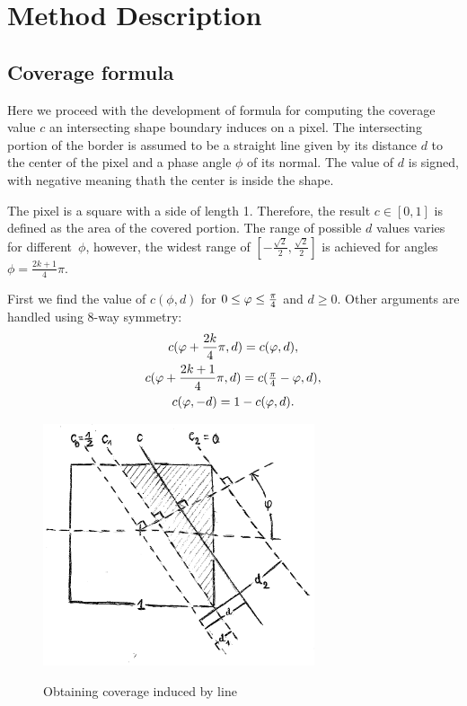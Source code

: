 \section{Method Description}

\subsection{Coverage formula}

Here we proceed with the development of formula for computing the coverage value $c$ an intersecting shape boundary induces on a pixel. The intersecting portion of the border is assumed to be a straight line given by its distance $d$ to the center of the pixel and a phase angle $\phi$ of its normal. The value of $d$ is signed, with negative meaning thath the center is inside the shape.

The pixel is a square with a side of length 1. Therefore, the result $c \in [0, 1]$ is defined as the area of the covered portion. The range of possible $d$ values varies for different~$\phi$, however, the widest range of $[-\frac{\sqrt{2}}{2}, \frac{\sqrt{2}}{2}]$ is achieved for angles $\phi = \frac{2k + 1}{4} \pi$.

First we find the value of $c(\phi, d)$ for $0 \leq \varphi \leq \tfrac{\pi}{4}$ and $d \geq 0$. Other arguments are handled using 8-way symmetry:
\begin{gather}
	c(\varphi + \frac{2k}{4}\pi, d) = c(\varphi, d), \\
    c(\varphi + \frac{2k+1}{4}\pi, d) = c(\tfrac{\pi}{4} - \varphi, d), \\
    c(\varphi, -d) = 1 - c(\varphi, d).
\end{gather}

\begin{figure}
	\includegraphics[width=8cm]{img/coverage-formula.png}
    \label{img:coverage-formula}
    \caption{Obtaining coverage induced by line}
\end{figure}

